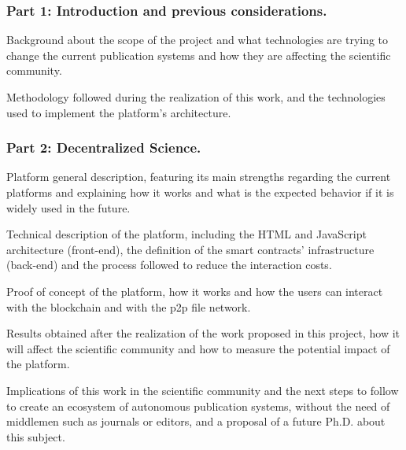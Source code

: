 \subsubsection*{Part 1: Introduction and previous considerations.}
\begin{itemize}
   Background about the scope of the
  project and what technologies are trying to change the current publication
  systems and how they are affecting the scientific community.

   Methodology followed during the realization
  of this work, and the technologies used to implement the platform's
  architecture.
\end{itemize}
\subsubsection*{Part 2: Decentralized Science.}
\begin{itemize}
   Platform general description, featuring its main
  strengths regarding the current platforms and explaining how it works and what
  is the expected behavior if it is widely used in the future.

   Technical description of the platform, including the
  HTML and JavaScript architecture (front-end), the definition of the smart contracts'
  infrastructure (back-end) and the process followed to reduce the interaction costs.

   Proof of concept of the platform, how it works and how the
  users can interact with the blockchain and with the p2p file network.

   Results obtained after the realization of the work proposed
  in this project, how it will affect the scientific community and how to
  measure the potential impact of the platform.

   Implications of this work in the scientific
  community and the next steps to follow to create an ecosystem of autonomous
  publication systems, without the need of middlemen such as journals or
  editors, and a proposal of a future Ph.D. about this subject.
\end{itemize}

\cleardoublepage



